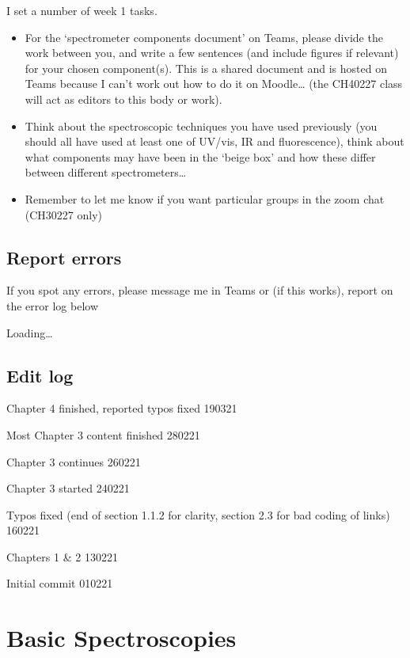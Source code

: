 \documentclass[
]{book}
\begin{document}
I set a number of week 1 tasks.

\begin{itemize}
\item
  For the `spectrometer components document' on Teams, please divide the work between you, and write a few sentences (and include figures if relevant) for your chosen component(s). This is a shared document and is hosted on Teams because I can't work out how to do it on Moodle\ldots{} (the CH40227 class will act as editors to this body or work).
\item
  Think about the spectroscopic techniques you have used previously (you should all have used at least one of UV/vis, IR and fluorescence), think about what components may have been in the `beige box' and how these differ between different spectrometers\ldots{}
\item
  Remember to let me know if you want particular groups in the zoom chat (CH30227 only)
\end{itemize}

\hypertarget{report-errors}{%
\section*{Report errors}\label{report-errors}}

If you spot any errors, please message me in Teams or (if this works), report on the error log below

Loading\ldots{}

\hypertarget{edit-log}{%
\section*{Edit log}\label{edit-log}}

Chapter 4 finished, reported typos fixed 190321

Most Chapter 3 content finished 280221

Chapter 3 continues 260221

Chapter 3 started 240221

Typos fixed (end of section 1.1.2 for clarity, section 2.3 for bad coding of links) 160221

Chapters 1 \& 2 130221

Initial commit 010221

\hypertarget{ch:UVvisfluorIR}{%
\chapter{Basic Spectroscopies}\label{ch:UVvisfluorIR}}
\end{document}
